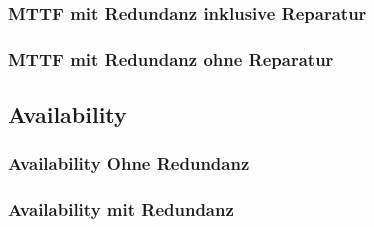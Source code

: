 \documentclass[
            a4paper
            ]{scrartcl}%
\begin{document}
\subsubsection{MTTF mit Redundanz inklusive Reparatur}


\subsubsection{MTTF mit Redundanz ohne Reparatur}

\newpage
\subsection{Availability}
\subsubsection{Availability Ohne Redundanz}


\subsubsection{Availability mit Redundanz}

\end{document}
